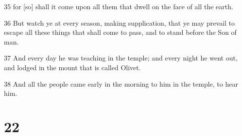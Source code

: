 \par 35 for [so] shall it come upon all them that dwell on the face of all the earth.
\par 36 But watch ye at every season, making supplication, that ye may prevail to escape all these things that shall come to pass, and to stand before the Son of man.
\par 37 And every day he was teaching in the temple; and every night he went out, and lodged in the mount that is called Olivet.
\par 38 And all the people came early in the morning to him in the temple, to hear him.

\chapter{22}

